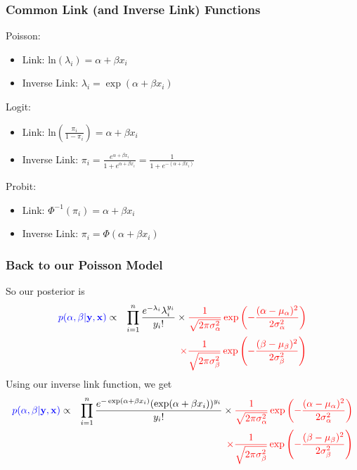 \documentclass{beamer}
\begin{document}
\begin{frame}
\frametitle{Common Link (and Inverse Link) Functions}
\pause
Poisson:
\begin{itemize}
\item Link: $\mathrm{ln} (\lambda_i) = \alpha + \beta x_i$
\item Inverse Link: $\lambda_i = \exp (\alpha + \beta x_i)$
\end{itemize}
\pause
Logit:
\begin{itemize}
\item Link: $\mathrm{ln} \left( \frac{\pi_i}{1-\pi_i} \right) = \alpha +
\beta x_i$
\item Inverse Link: $\pi_i = \frac{e^{\alpha + \beta x_i}}{1 + e^{\alpha + \beta x_i}} = \frac{1}{1 + e^{-(\alpha + \beta x_i)}}$
\end{itemize}
\pause
Probit:
\begin{itemize}
\item Link: $\Phi^{-1}(\pi_i) = \alpha + \beta x_i$
\item Inverse Link: $\pi_i = \Phi(\alpha + \beta x_i)$
\end{itemize}
\end{frame}

\begin{frame}
\frametitle{Back to our Poisson Model}
\pause
So our posterior is 
\footnotesize
\begin{eqnarray*}
\textcolor{blue}{p(\alpha, \beta | \mathbf{y}, \mathbf{x})} &\propto&
\prod_{i=1}^n \frac{e^{-\lambda_i} \lambda_i^{y_i}}{y_i !} \times
\textcolor{red}{\frac{1}{\sqrt{2\pi \sigma^2_{\alpha}}} \exp \left(-
\frac{(\alpha - \mu_{\alpha})^2}{2 \sigma_{\alpha}^2}\right)}\\
&\phantom{\propto}& \textcolor{red}{\times \frac{1}{\sqrt{2\pi \sigma^2_{\beta}}} \exp \left(-\frac{(\beta - \mu_{\beta})^2}{2 \sigma_{\beta}^2}\right)} 
\end{eqnarray*}
\pause
\normalsize
Using our inverse link function, we get
\footnotesize
\begin{eqnarray*}
\textcolor{blue}{p(\alpha, \beta | \mathbf{y}, \mathbf{x})} &\propto&
\prod_{i=1}^n \frac{e^{-\exp (\alpha + \beta x_i)} (\exp (\alpha +
\beta x_i))^{y_i}}{y_i !} \times
\textcolor{red}{\frac{1}{\sqrt{2\pi \sigma^2_{\alpha}}} \exp \left(-
\frac{(\alpha - \mu_{\alpha})^2}{2 \sigma_{\alpha}^2}\right)}\\
&\phantom{\propto}& \textcolor{red}{\times \frac{1}{\sqrt{2\pi \sigma^2_{\beta}}} \exp \left(-\frac{(\beta - \mu_{\beta})^2}{2 \sigma_{\beta}^2}\right)} 
\end{eqnarray*}
\end{frame}
\end{document}
